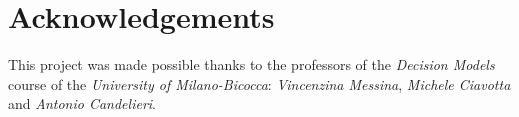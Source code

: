 \documentclass[10pt]{article}
\begin{document}

%
%
\newpage
\section*{Acknowledgements}
This project was made possible thanks to the professors of the \textit{Decision Models} course of the \textit{University of Milano-Bicocca}: \textit{Vincenzina Messina}, \textit{Michele Ciavotta} and \textit{Antonio Candelieri}.
\end{document}
